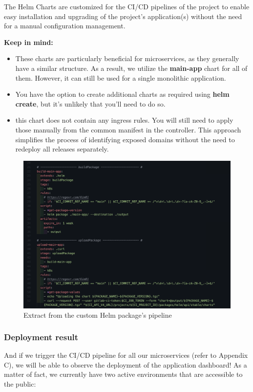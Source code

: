 The Helm Charts are customized for the CI/CD pipelines of the project to enable easy installation and upgrading of the project's application(s) without the need for a manual configuration management.

\textbf{Keep in mind:}
\begin{itemize}
  \item These charts are particularly beneficial for microservices, as they generally have a similar structure. As a result, we utilize the \textbf{main-app}  chart for all of them. However, it can still be used for a single monolithic application.
  \item You have the option to create additional charts as required using \textbf{helm create}, but it's unlikely that you'll need to do so.
  \item this chart does not contain any ingress rules. You will still need to apply those manually from the common manifest in the controller. This approach simplifies the process of identifying exposed domains without the need to redeploy all releases separately.

\end{itemize}


\begin{figure}[H]
  \centering
  \includegraphics[width=1\textwidth]{src/assets/chapters/helmpipeline.png}
  \caption{Extract from the custom Helm package’s pipeline}
  \label{fig:custom-helm-pipeline}
\end{figure}

\subsubsection{Deployment result}
And if we trigger the CI/CD pipeline for all our microservices (refer to Appendix C), we will be able to observe the deployment of the application dashboard! As a matter of fact, we currently have two active environments that are accessible to the public:

